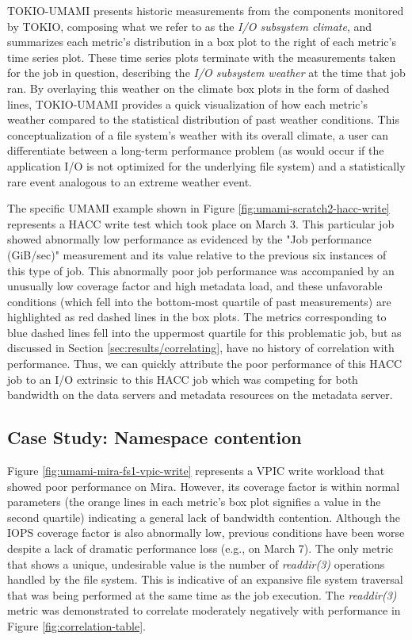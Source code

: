 TOKIO-UMAMI presents historic measurements from the components monitored by TOKIO, composing what we refer to as the \emph{I/O subsystem climate}, and summarizes each metric's distribution in a box plot to the right of each metric's time series plot.
These time series plots terminate with the measurements taken for the job in question, describing the \emph{I/O subsystem weather} at the time that job ran.
By overlaying this weather on the climate box plots in the form of dashed lines, TOKIO-UMAMI provides a quick visualization of how each metric's weather compared to the statistical distribution of past weather conditions.
This conceptualization of a file system's weather with its overall climate, a user can differentiate between a long-term performance problem (as would occur if the application I/O is not optimized for the underlying file system) and a statistically rare event analogous to an extreme weather event.

The specific UMAMI example shown in Figure \ref{fig:umami-scratch2-hacc-write} represents a HACC write test which took place on March 3.
This particular job showed abnormally low performance as evidenced by the "Job performance (GiB/sec)" measurement and its value relative to the previous six instances of this type of job.
This abnormally poor job performance was accompanied by an unusually low coverage factor and high metadata load, and these unfavorable conditions (which fell into the bottom-most quartile of past measurements) are highlighted as red dashed lines in the box plots.
The metrics corresponding to blue dashed lines fell into the uppermost quartile for this problematic job, but as discussed in Section \ref{sec:results/correlating}, have no history of correlation with performance.
Thus, we can quickly attribute the poor performance of this HACC job to an I/O extrinsic to this HACC job which was competing for both bandwidth on the data servers and metadata resources on the metadata server.

\subsection{Case Study: Namespace contention}

Figure \ref{fig:umami-mira-fs1-vpic-write} represents a VPIC write workload
that showed poor performance on Mira.  However, its coverage factor is within
normal parameters (the orange lines in each metric's box plot signifies a
value in the second quartile) indicating a general lack of bandwidth
contention.  Although the IOPS coverage factor is also abnormally low,
previous conditions have been worse despite a lack of dramatic performance
loss (e.g., on March 7).  The only metric that shows a unique, undesirable
value is the number of \emph{readdir(3)} operations handled by the file
system.  This is indicative of an expansive file system traversal that was
being performed at the same time as the job execution.  The \emph{readdir(3)}
metric was demonstrated to correlate moderately negatively with performance in Figure \ref{fig:correlation-table}.

